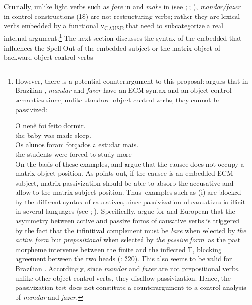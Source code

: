 \documentclass[output=paper]{langsci/langscibook}
\begin{document}
Crucially, unlike light verbs such as \textit{fare} in  and \textit{make} in  (see \citealt{Guasti1996}; \citealt{Folli2007}; \citealt{Pylkkänen2002,Pylkkänen2008}), \textit{mandar\slash fazer} in control constructions (18) are not restructuring verbs; rather they are lexical verbs embedded by a functional v\textsubscript{CAUSE}  that need to subcategorize a real internal argument.\footnote{However, there is a potential counterargument to this proposal: \citet{Farrell1995} argues that in Brazilian , \textit{mandar} and \textit{fazer} have an ECM syntax and an object control semantics since, unlike standard object control verbs, they cannot be passivized:

\ea\gll * O nenê   foi feito    dormir.\\
          {}  the baby  was made  sleep.\\
\z
\ea\gll {} Os alunos  foram forçados  a  estudar  mais.\\
         {}  the students were  forced to study  more\\
\z
On the basis of these examples, \citet{Farrell1995} and \citet{Hornstein2003} argue that the causee does not occupy a matrix object position. As \citet{Landau2004} points out, if the causee is an embedded ECM subject, matrix passivization should be able to absorb the accusative and allow  to the matrix subject position. Thus, examples such as (i) are blocked by the different syntax of causatives, since passivization of causatives is illicit in several languages (see \citealt{Landau2004}; \citealt{Hornstein2008}). Specifically, \citet{Hornstein2008} argue for  and European  that the asymmetry between active and passive forms of causative verbs is triggered by the fact that the infinitival complement must be \textit{bare} when selected by \textit{the active form} but \textit{prepositional} when selected by \textit{the passive form}, as the past  morpheme intervenes between the finite and the inflected T, blocking agreement between the two heads (\citealt{Hornstein2008}: 220).  This also seems to be valid for Brazilian . Accordingly, since \textit{mandar} and \textit{fazer} are not prepositional verbs, unlike other object control verbs, they disallow passivization. Hence, the passivization test does not constitute a counterargument to a control analysis of \textit{mandar} and \textit{fazer.}} The next section discusses the syntax of the embedded  that influences the Spell-Out of the embedded subject or the matrix object of backward object control verbs. 
\end{document}
